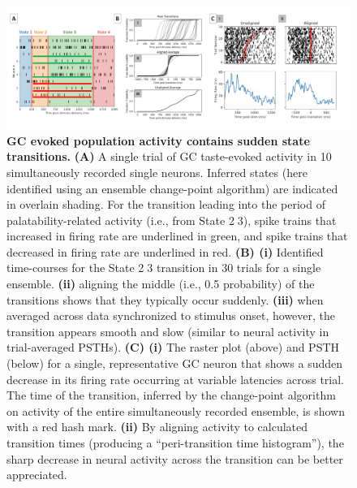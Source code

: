 \begin{refsection}
\begin{figure}
\includegraphics[width=\linewidth]{mahmood_22_figures/fig3-0.png}
\caption{\textbf{GC evoked population activity contains sudden state transitions.} \textbf{(A)} A single trial of GC taste-evoked activity in 10 simultaneously recorded single neurons. Inferred states (here identified using an ensemble change-point algorithm) are indicated in overlain shading. For the transition leading into the period of palatability-related activity (i.e., from State 23), spike trains that increased in firing rate are underlined in green, and spike trains that decreased in firing rate are underlined in red. \textbf{(B) (i)}  Identified time-courses for the State 23 transition in 30 trials for a single ensemble. \textbf{(ii)} aligning the middle (i.e., 0.5 probability) of the transitions shows that they typically occur suddenly. \textbf{(iii)} when averaged across data synchronized to stimulus onset, however, the transition appears smooth and slow (similar to neural activity in trial-averaged PSTHs). \textbf{(C) (i)} The raster plot (above) and PSTH (below) for a single, representative GC neuron that shows a sudden decrease in its firing rate occurring at variable latencies across trial. The time of the transition, inferred by the change-point algorithm on activity of the entire simultaneously recorded ensemble, is shown with a red hash mark. \textbf{(ii)} By aligning activity to calculated transition times (producing a “peri-transition time histogram”), the sharp decrease in neural activity across the transition can be better appreciated.}
\label{fig:wrapfig}
\end{figure}


\end{refsection}
